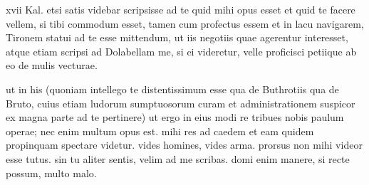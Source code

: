 


 xvii Kal. etsi satis videbar scripsisse ad te quid mihi opus esset et quid te facere vellem, si tibi commodum esset, tamen cum profectus essem et in lacu navigarem, Tironem statui ad te esse mittendum, ut iis negotiis quae agerentur interesset, atque etiam scripsi ad Dolabellam me, si ei videretur, velle proficisci petiique ab eo de mulis vecturae.

 ut in his (quoniam intellego te distentissimum esse qua de Buthrotiis qua de Bruto, cuius etiam ludorum sumptuosorum curam et administrationem suspicor ex magna parte ad te pertinere) ut ergo in eius modi re tribues nobis paulum operae; nec enim multum opus est. mihi res ad caedem et eam quidem propinquam spectare videtur. vides homines, vides arma. prorsus non mihi videor esse tutus. sin tu aliter sentis, velim ad me scribas. domi enim manere, si recte possum, multo malo.
